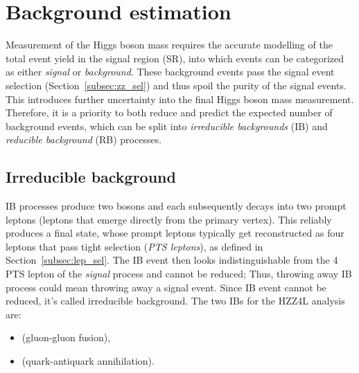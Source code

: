 \section{Background estimation}
\label{sec:bkg_estim}
Measurement of the Higgs boson mass requires the accurate modelling of the total event yield in the signal region (SR), into which events can be categorized as either \emph{signal} or \emph{background}.
These background events pass the signal event selection (Section~\ref{subsec:zz_sel}) and thus spoil the purity of the signal events.
This introduces further uncertainty into the final Higgs boson mass measurement.
Therefore, it is a priority to both reduce and predict the expected number of background events, which can be split into \emph{irreducible backgrounds} (IB) and \emph{reducible background} (RB) processes.

\subsection{Irreducible background}
\label{sec:bkg_irred}
IB processes produce two \PZ bosons and each \PZ subsequently decays into two prompt leptons (leptons that emerge directly from the primary vertex).
This reliably produces a \fourell final state, whose prompt leptons typically get reconstructed as four leptons that pass tight selection (\emph{PTS leptons}), as defined in Section~\ref{subsec:lep_sel}.
The IB event then looks indistinguishable from the 4 PTS lepton of the \emph{signal} process and cannot be reduced;
Thus, throwing away IB process could mean throwing away a signal event.
Since IB event cannot be reduced, it's called irreducible background.
The two IBs for the HZZ4L analysis are:
\begin{itemize}
    \item \ggZZfourl (gluon-gluon fusion),
    \item \qqggZZfourl (quark-antiquark annihilation).
\end{itemize}

